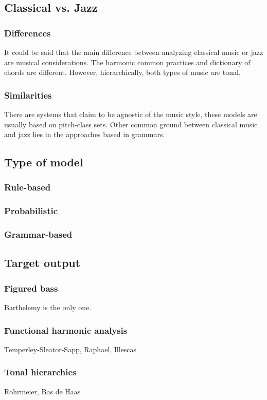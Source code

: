   \subsection{Classical vs. Jazz}
    \subsubsection{Differences}
    It could be said that the main difference between analyzing classical music or jazz are musical considerations. The harmonic common practices and dictionary of chords are different. However, hierarchically, both types of music are tonal.
    \subsubsection{Similarities}
    There are systems that claim to be agnostic of the music style, these models are usually based on pitch-class sets. Other common ground between classical music and jazz lies in the approaches based in grammars.
  \subsection{Type of model}
    \subsubsection{Rule-based}
    \subsubsection{Probabilistic}
    \subsubsection{Grammar-based}
  \subsection{Target output}
    \subsubsection{Figured bass}
    Barthelemy is the only one.
    \subsubsection{Functional harmonic analysis}
    Temperley-Sleator-Sapp, Raphael, Illescas
    \subsubsection{Tonal hierarchies}
    Rohrmeier, Bas de Haas
